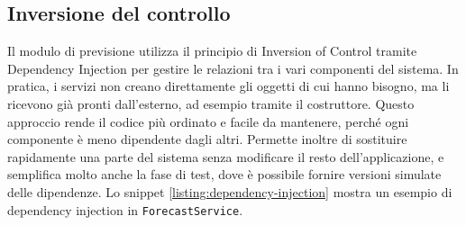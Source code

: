 \captionsetup{type=listing, belowskip=0pt}
\inputminted[fontsize=\small, breaklines, breakanywhere=true, linenos=true, bgcolor=gray!10]{python}{code/repository_pattern.py}
\label{listing:repository-pattern}

\subsection{Inversione del controllo}
Il modulo di previsione utilizza il principio di Inversion of Control tramite Dependency Injection per gestire le relazioni tra i vari componenti del sistema.
In pratica, i servizi non creano direttamente gli oggetti di cui hanno bisogno, ma li ricevono già pronti dall’esterno, ad esempio tramite il costruttore.
Questo approccio rende il codice più ordinato e facile da mantenere, perché ogni componente è meno dipendente dagli altri.
Permette inoltre di sostituire rapidamente una parte del sistema senza modificare il resto dell’applicazione, e semplifica molto anche la fase di test, dove è possibile fornire versioni simulate delle dipendenze.
Lo snippet \ref{listing:dependency-injection} mostra un esempio di dependency injection in \texttt{ForecastService}.
\captionsetup{type=listing, belowskip=0pt}
\inputminted[fontsize=\small, breaklines, breakanywhere=true, linenos=true, bgcolor=gray!10]{python}{code/dependency_injection.py}
\label{listing:dependency-injection}
